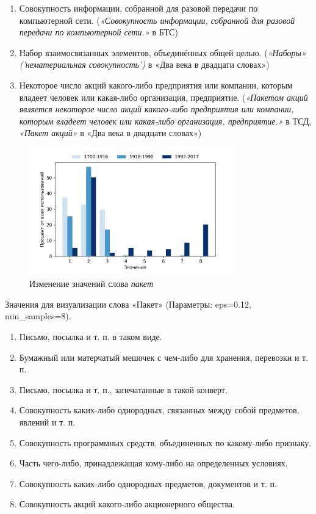 \begin{enumerate}
    \item Совокупность информации, собранной для разовой передачи по компьютерной сети.
(\textit{«Совокупность информации, собранной для разовой передачи по компьютерной сети.»} в БТС)

    \item Набор взаимосвязанных элементов, объединённых общей целью.
(\textit{«Наборы» ('нематериальная совокупность')} в «Два века в двадцати словах»)

    \item Некоторое число акций какого-либо предприятия или компании, которым владеет человек или какая-либо организация, предприятие.
(\textit{«Пакетом акций является некоторое число акций какого-либо предприятия или компании, которым владеет человек или какая-либо организация, предприятие.»} в ТСД,
\textit{«Пакет акций»} в «Два века в двадцати словах»)
\end{enumerate}

\begin{figure}[H]
	\centering
	\includegraphics[width=0.8\textwidth]{img/visualizations/paket_minimal}
	\caption{Изменение значений слова \textit{пакет}}
	\label{fig:Пакет}
\end{figure}

Значения для визуализации слова «Пакет» (Параметры: eps=0.12, min\_samples=8).

\begin{enumerate}
    \item Письмо, посылка и т. п. в таком виде.
    \item Бумажный или матерчатый мешочек с чем-либо для хранения, перевозки и т. п.
    \item Письмо, посылка и т. п., запечатанные в такой конверт.
    \item Совокупность каких-либо однородных, связанных между собой предметов, явлений и т. п.
    \item Совокупность программных средств, объединенных по какому-либо признаку.
    \item Часть чего-либо, принадлежащая кому-либо на определенных условиях.
    \item Совокупность каких-либо однородных предметов, документов и т. п.
    \item Совокупность акций какого-либо акционерного общества.
\end{enumerate}

